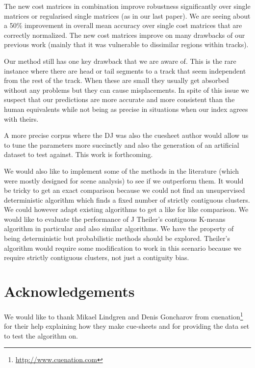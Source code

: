 \documentclass[twocolumn]{article}
\begin{document}
The new cost matrices in combination improve robustness significantly over single matrices or regularised single matrices (as in our last paper). We are seeing about a 50\% improvement in overall mean accuracy over single cost matrices that are correctly normalized. The new cost matrices improve on many drawbacks of our previous work (mainly that it was vulnerable to dissimilar regions within tracks). 

Our method still has one key drawback that we are aware of. This is the rare instance where there are head or tail segments to a track that seem independent from the rest of the track. When these are small they usually get absorbed without any problems but they can cause misplacements. In spite of this issue we suspect that our predictions are more accurate and more consistent than the human equivalents while not being as precise in situations when our index agrees with theirs.

A more precise corpus where the DJ was also the cuesheet author would allow us to tune the parameters more succinctly and also the generation of an artificial dataset to test against. This work is forthcoming. 

We would also like to implement some of the methods in the literature (which were mostly designed for scene analysis) to see if we outperform them. It would be tricky to get an exact comparison because we could not find an unsupervised deterministic algorithm which finds a fixed number of strictly contiguous clusters. We could however adapt existing algorithms to get a like for like comparison. We would like to evaluate the performance of J Theiler's contiguous K-means algorithm in particular \cite{theiler1997contiguity} and also similar algorithms. We have the property of being deterministic but probabilistic methods should be explored. Theiler's algorithm would require some modification to work in this scenario because we require strictly contiguous clusters, not just a contiguity bias. 

\section{Acknowledgements}\label{sec:acknowledgements}

We would like to thank Mikael Lindgren and Denis Goncharov from cuenation\footnote{\url{http://www.cuenation.com}} for their help explaining how they make cue-sheets and for providing the data set to test the algorithm on.



\end{document}
